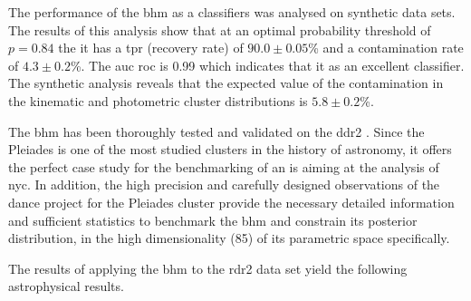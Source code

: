 The performance of the \gls{bhm} as a classifiers was analysed on synthetic data sets. The results of this analysis show that at an optimal probability threshold of $p=0.84$ the it has a \acrlong{tpr} (recovery rate) of $90.0\pm0.05$\% and a contamination rate of $4.3\pm0.2$\%. The \acrlong{auc} \acrlong{roc} is 0.99 which indicates that it as an excellent classifier. The synthetic analysis reveals that the expected value of the contamination in the kinematic and photometric cluster distributions is $5.8\pm 0.2$\%.

The \gls{bhm} has been thoroughly tested and validated on the \acrlong{ddr2} \citep{Bouy2015}. Since the Pleiades is one of the most studied clusters in the history of astronomy, it offers the perfect case study for the benchmarking of an \gls{is} aiming at the analysis of \gls{nyc}. In addition, the high precision and carefully designed observations of the \gls{dance} project for the Pleiades cluster provide the necessary detailed information and sufficient statistics to benchmark the \gls{bhm} and constrain its posterior distribution, in the high dimensionality (85) of its parametric space specifically. 

The results of applying the \gls{bhm} to the \acrfull{rdr2} data set yield the following astrophysical results.

